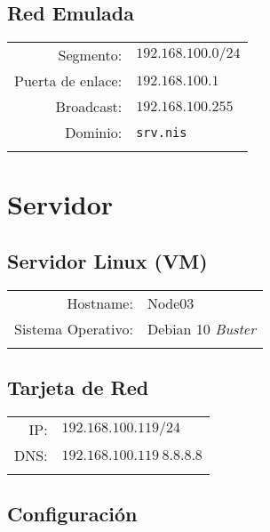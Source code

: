 \documentclass[../main.tex]{subfiles}
\begin{document}
\subsection{Red Emulada}\label{sec:red_emu}
\begin{table}[H]
  \centering
  \begin{tabular}{rl}
    \hline{}
    Segmento:&$192.168.100.0/24$\\
    Puerta de enlace:&$192.168.100.1$\\
    Broadcast:&$192.168.100.255$\\
    Dominio:&\texttt{srv.nis}\\
    \hline{}
  \end{tabular}
\end{table}

\section{Servidor}\label{sec:servidor}

\subsection{Servidor Linux (VM)}\label{sec:slvm}
\begin{table}[H]
  \centering
  \begin{tabular}{rl}
    \hline{}
    Hostname: &Node03\\
    Sistema Operativo: & Debian 10 \textit{Buster}\\
    \hline{}
  \end{tabular}
\end{table}
\vfill{}
\subsection{Tarjeta de Red}\label{sec:tr}
\begin{table}[H]
  \centering
  \begin{tabular}{rl}
    \hline{}
    IP:&$192.168.100.119/24$\\
    DNS:&$192.168.100.119\ 8.8.8.8$\\
    \hline{}
  \end{tabular}
\end{table}

\subsection{Configuración}\label{sec:serv_conf}
\end{document}
